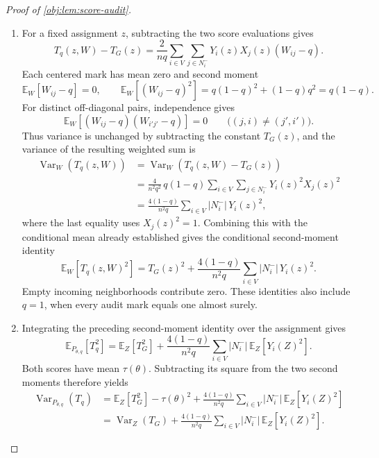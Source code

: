 \begin{proof}[Proof of \cref{obj:lem:score-audit}]
\begin{enumerate}
\item For a fixed assignment \(z\), subtracting the two score evaluations gives
\[
T_q(z,W)-T_G(z)
=
\frac{2}{nq}\sum_{i\in V}\sum_{j\in N_i^-}
Y_i(z)X_j(z)(W_{ij}-q).
\]
Each centered mark has mean zero and second moment
\[
\mathbb E_W[W_{ij}-q]=0,
\qquad
\mathbb E_W[(W_{ij}-q)^2]
=q(1-q)^2+(1-q)q^2
=q(1-q).
\]
For distinct off-diagonal pairs, independence gives
\[
\mathbb E_W[(W_{ij}-q)(W_{i'j'}-q)]=0
\qquad\bigl((j,i)\ne(j',i')\bigr).
\]
Thus variance is unchanged by subtracting the constant \(T_G(z)\), and the variance of the resulting weighted sum is
\[
\begin{aligned}
\operatorname{Var}_W(T_q(z,W))
&=\operatorname{Var}_W(T_q(z,W)-T_G(z))\\
&=\frac{4}{n^2q^2}\,q(1-q)
 \sum_{i\in V}\sum_{j\in N_i^-}Y_i(z)^2X_j(z)^2\\
&=\frac{4(1-q)}{n^2q}
 \sum_{i\in V}|N_i^-|\,Y_i(z)^2,
\end{aligned}
\]
where the last equality uses \(X_j(z)^2=1\). Combining this with the conditional mean already established gives the conditional second-moment identity
\[
\mathbb E_W[T_q(z,W)^2]
=
T_G(z)^2
+\frac{4(1-q)}{n^2q}
 \sum_{i\in V}|N_i^-|\,Y_i(z)^2.
\]
Empty incoming neighborhoods contribute zero. These identities also include \(q=1\), when every audit mark equals one almost surely.

\item Integrating the preceding second-moment identity over the assignment gives
\[
\mathbb E_{P_{\theta,q}}[T_q^2]
=
\mathbb E_Z[T_G^2]
+\frac{4(1-q)}{n^2q}
 \sum_{i\in V}|N_i^-|\,\mathbb E_Z[Y_i(Z)^2].
\]
Both scores have mean \(\tau(\theta)\). Subtracting its square from the two second moments therefore yields
\[
\begin{aligned}
\operatorname{Var}_{P_{\theta,q}}(T_q)
&=\mathbb E_Z[T_G^2]-\tau(\theta)^2
 +\frac{4(1-q)}{n^2q}
  \sum_{i\in V}|N_i^-|\,\mathbb E_Z[Y_i(Z)^2]\\
&=\operatorname{Var}_Z(T_G)
 +\frac{4(1-q)}{n^2q}
  \sum_{i\in V}|N_i^-|\,\mathbb E_Z[Y_i(Z)^2].
\end{aligned}
\]


\end{enumerate}
\end{proof}
